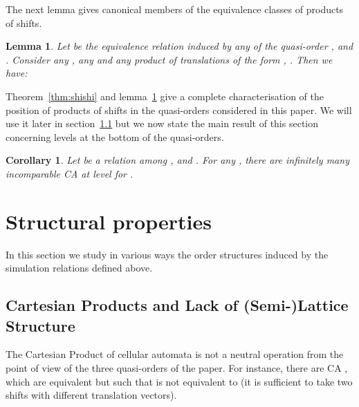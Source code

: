 \documentclass[a4paper]{elsarticle}
\def\qed{\relax\ifmmode\hskip2em \blacksquare\else\unskip\nobreak\hfill\hskip1em \fi}
\newtheorem{lm}{Lemma}[section]
\newtheorem{cor}{Corollary}[section]
\begin{document}
The next lemma gives canonical members of the equivalence classes of
products of shifts.

\begin{lm}
  \label{lm:canoshi}
  Let  be the equivalence relation induced by any of the
  quasi-order ,  and .  Consider any
  , any  and any product of translations of the form
  , . Then we have:
  
\end{lm}


Theorem~\ref{thm:shishi} and lemma~\ref{lm:canoshi} give a complete
characterisation of the position of products of shifts in the
quasi-orders considered in this paper. We will use it later in
section~\ref{sec:lattice} but we now state the main result of this
section concerning levels at the bottom of the quasi-orders.

\begin{cor}
  \label{cor:infinishi}
  Let  be a relation among ,  and
  . For any , there are infinitely many
  incomparable CA at level  for .
\end{cor}


\section{Structural properties}
\label{sec:sp}

In this section we study in various ways the order structures induced
by the simulation relations defined above.


\subsection{Cartesian Products and Lack of (Semi-)Lattice Structure}
\label{sec:lattice}

The Cartesian Product of cellular automata is not a neutral operation
from the point of view of the three quasi-orders of the paper. For
instance, there are CA ,  which are equivalent but such
that  is not equivalent to  (it is
sufficient to take two shifts with different translation vectors).
\end{document}
